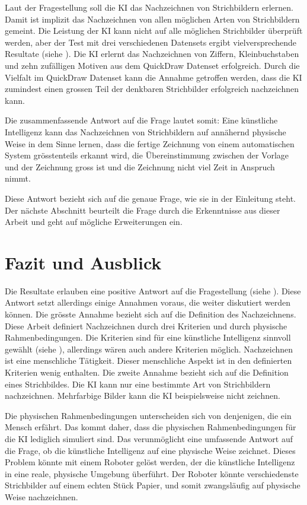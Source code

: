 Laut der Fragestellung soll die KI das Nachzeichnen von Strichbildern erlernen.
Damit ist implizit das Nachzeichnen von allen möglichen Arten von Strichbildern
gemeint. Die Leistung der KI kann nicht auf alle möglichen Strichbilder
überprüft werden, aber der Test mit drei verschiedenen Datensets ergibt
vielversprechende Resultate (siehe ). Die KI erlernt das
Nachzeichnen von Ziffern, Kleinbuchstaben und zehn zufälligen Motiven aus dem
QuickDraw Datenset erfolgreich. Durch die Vielfalt im QuickDraw Datenset kann
die Annahme getroffen werden, dass die KI zumindest einen grossen Teil der
denkbaren Strichbilder erfolgreich nachzeichnen kann.
 
Die zusammenfassende Antwort auf die Frage lautet somit: Eine künstliche
Intelligenz kann das Nachzeichnen von Strichbildern auf annähernd physische Weise
in dem Sinne lernen, dass die fertige Zeichnung von einem automatischen System
grösstenteils erkannt wird, die Übereinstimmung zwischen der Vorlage und der
Zeichnung gross ist und die Zeichnung nicht viel Zeit in Anspruch nimmt.
 
Diese Antwort bezieht sich auf die genaue Frage, wie sie in der Einleitung steht.
Der nächste Abschnitt beurteilt die Frage durch die Erkenntnisse aus dieser
Arbeit und geht auf mögliche Erweiterungen ein.
 
 
\section{Fazit und Ausblick}\label{chap:d_faz-aus} Die Resultate erlauben eine
positive Antwort auf die Fragestellung (siehe ).
Diese Antwort setzt allerdings einige Annahmen voraus, die weiter diskutiert
werden können. Die grösste Annahme bezieht sich auf die Definition des
Nachzeichnens. Diese Arbeit definiert Nachzeichnen durch drei Kriterien und
durch physische Rahmenbedingungen. Die Kriterien sind für eine künstliche
Intelligenz sinnvoll gewählt (siehe ),
allerdings wären auch andere Kriterien möglich. Nachzeichnen ist eine
menschliche Tätigkeit. Dieser menschliche Aspekt ist in den definierten
Kriterien wenig enthalten. Die zweite Annahme bezieht sich auf die Definition
eines Strichbildes. Die KI kann nur eine bestimmte Art von Strichbildern
nachzeichnen. Mehrfarbige Bilder kann die KI beispielsweise nicht zeichnen.
 
Die physischen Rahmenbedingungen unterscheiden sich von denjenigen, die ein
Mensch erfährt. Das kommt daher, dass die physischen Rahmenbedingungen für die KI
lediglich simuliert sind. Das verunmöglicht eine umfassende Antwort auf die
Frage, ob die künstliche Intelligenz auf eine physische Weise zeichnet. Dieses
Problem könnte mit einem Roboter gelöst werden, der die künstliche Intelligenz
in eine reale, physische Umgebung überführt. Der Roboter könnte verschiedenste
Strichbilder auf einem echten Stück Papier, und somit zwangsläufig auf physische
Weise nachzeichnen.
 
